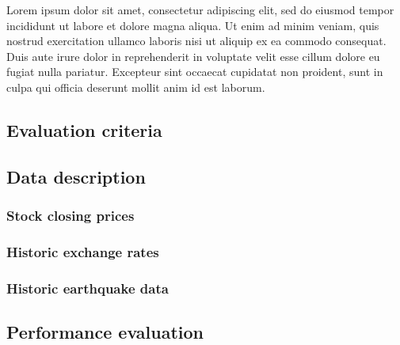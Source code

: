\documentclass{article}
\begin{document}
Lorem ipsum dolor sit amet, consectetur adipiscing elit, sed do eiusmod tempor incididunt ut labore et dolore magna aliqua. Ut enim ad minim veniam, quis nostrud exercitation ullamco laboris nisi ut aliquip ex ea commodo consequat. Duis aute irure dolor in reprehenderit in voluptate velit esse cillum dolore eu fugiat nulla pariatur. Excepteur sint occaecat cupidatat non proident, sunt in culpa qui officia deserunt mollit anim id est laborum.

\subsection{Evaluation criteria}

\subsection{Data description}

\subsubsection{Stock closing prices}
\subsubsection{Historic exchange rates}
\subsubsection{Historic earthquake data}


\subsection{Performance evaluation}
\end{document}
